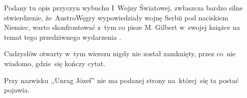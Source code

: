 \documentclass[a4paper,11pt]{article}
\begin{document}
\vspace{\spaceFour}


\start {} Podany tu opis przyczyn wybuchu I~Wojny Światowej,
zwłaszcza bardzo silne stwierdzenie, że~Austro\dywiz Węgry
wypowiedziały wojnę Serbii pod naciskiem Niemiec, warto skonfrontować
z~tym co pisze M. Gilbert w~swojej książce na temat tego przedziwnego
wydarzenia \cite{GilbertPierwszaWojnaSwiatowa03}.

\vspace{\spaceFour}


\start {} Cudzysłów otwarty w~tym wierszu nigdy nie został
zamknięty, przez co~nie wiadomo, gdzie~się kończy cytat.

\start {} Przy nazwisku ,,Unrag Józef'' nie ma podanej
strony na~której~się ta postać pojawia.
\end{document}
